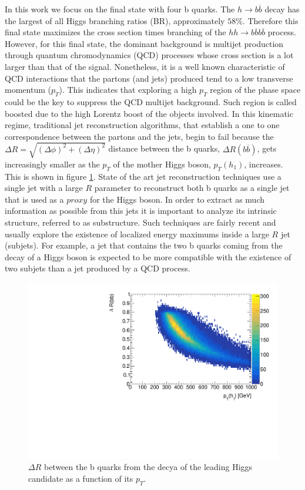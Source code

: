 In this work we focus on the final state with four b quarks. The $h\rightarrow b\overline{b}$ decay has the largest of all Higgs branching ratios (BR), approximately $58\%$. Therefore this final state maximizes the cross section times branching of the $hh\rightarrow b\overline{b}b\overline{b}$ process. However, for this final state, the dominant background is multijet production through quantum chromodynamics (QCD) processes whose cross section is a lot larger than that of the signal. Nonetheless, it is a well known characteristic of QCD interactions that the partons (and jets) produced tend to a low transverse momentum ($p_T$). This indicates that exploring a high $p_T$ region of the phase space could be the key to suppress the QCD multijet background. Such region is called boosted due to the high Lorentz boost of the objects involved. In this kinematic regime, traditional jet reconstruction algorithms, that establish a one to one correspondence between the partons and the jets, begin to fail because the $\Delta R=\sqrt{(\Delta\phi)^2+(\Delta\eta)^2}$ distance between the b quarks, $\Delta R(b\overline{b})$, gets increasingly smaller as the $p_T$ of the mother Higgs boson, $p_T(h_1)$, increases. This is shown in figure \ref{fig:deltaRbb_pt}. State of the art jet reconstruction techniques \cite{jetsub} use a single jet with a large $R$ parameter to reconstruct both b quarks as a single jet that is used as a $\textit{proxy}$ for the Higgs boson. In order to extract as much information as possible from this jets it is important to analyze its intrinsic structure, referred to as substructure. Such techniques are fairly recent and usually explore the existence of localized energy maximums inside a large $R$ jet (subjets). For example, a jet that contains the two b quarks coming from the decay of a Higgs boson is expected to be more compatible with the existence of two subjets than a jet produced by a QCD process.

\begin{figure}[h]
	\centering
	\includegraphics[trim={.5cm 0 0 0},clip,width=\linewidth]{./images/hist_deltaR_bb_pt.pdf}
	\caption{$\Delta R$ between the b quarks from the decya of the leading Higgs candidate as a function of its $p_T$.}
	\label{fig:deltaRbb_pt}
\end{figure}

